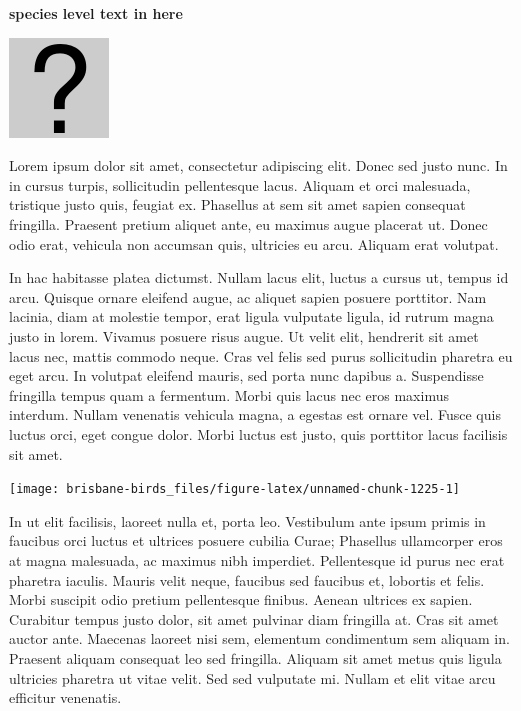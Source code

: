 \documentclass[]{book}
\let\origfigure\figure
\let\endorigfigure\endfigure
\renewenvironment{figure}[1][2] {
  \expandafter\origfigure\expandafter[H]
} {
  \endorigfigure
}
\begin{document}
\textbf{species level text in here}

\begin{figure}
\centering
\includegraphics{assets/missing.png}
\caption{No image for species}
\end{figure}

Lorem ipsum dolor sit amet, consectetur adipiscing elit. Donec sed justo
nunc. In in cursus turpis, sollicitudin pellentesque lacus. Aliquam et
orci malesuada, tristique justo quis, feugiat ex. Phasellus at sem sit
amet sapien consequat fringilla. Praesent pretium aliquet ante, eu
maximus augue placerat ut. Donec odio erat, vehicula non accumsan quis,
ultricies eu arcu. Aliquam erat volutpat.

In hac habitasse platea dictumst. Nullam lacus elit, luctus a cursus ut,
tempus id arcu. Quisque ornare eleifend augue, ac aliquet sapien posuere
porttitor. Nam lacinia, diam at molestie tempor, erat ligula vulputate
ligula, id rutrum magna justo in lorem. Vivamus posuere risus augue. Ut
velit elit, hendrerit sit amet lacus nec, mattis commodo neque. Cras vel
felis sed purus sollicitudin pharetra eu eget arcu. In volutpat eleifend
mauris, sed porta nunc dapibus a. Suspendisse fringilla tempus quam a
fermentum. Morbi quis lacus nec eros maximus interdum. Nullam venenatis
vehicula magna, a egestas est ornare vel. Fusce quis luctus orci, eget
congue dolor. Morbi luctus est justo, quis porttitor lacus facilisis sit
amet.

\begin{figure}
\texttt{[image: brisbane-birds\_files/figure-latex/unnamed-chunk-1225-1]} \caption{insert figure caption}\label{fig:unnamed-chunk-1225}
\end{figure}

In ut elit facilisis, laoreet nulla et, porta leo. Vestibulum ante ipsum
primis in faucibus orci luctus et ultrices posuere cubilia Curae;
Phasellus ullamcorper eros at magna malesuada, ac maximus nibh
imperdiet. Pellentesque id purus nec erat pharetra iaculis. Mauris velit
neque, faucibus sed faucibus et, lobortis et felis. Morbi suscipit odio
pretium pellentesque finibus. Aenean ultrices ex sapien. Curabitur
tempus justo dolor, sit amet pulvinar diam fringilla at. Cras sit amet
auctor ante. Maecenas laoreet nisi sem, elementum condimentum sem
aliquam in. Praesent aliquam consequat leo sed fringilla. Aliquam sit
amet metus quis ligula ultricies pharetra ut vitae velit. Sed sed
vulputate mi. Nullam et elit vitae arcu efficitur venenatis.
\end{document}
